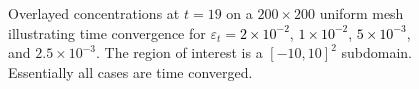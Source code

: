 \begin{figure}[hbtp]
\begin{centering}
    \caption[Overlayed concentrations at $t=19$ on a $200\times 200$ uniform mesh illustrating time convergence]{Overlayed concentrations at $t=19$ on a $200\times 200$ uniform mesh illustrating time convergence for $\varepsilon_t=$\textcolor{black}{$2\times 10^{-2}$}, \textcolor{black}{$1\times 10^{-2}$}, \textcolor{black}{$5\times 10^{-3}$}, and $2.5\times 10^{-3}$.  The region of interest is a $[-10,10]^2$ subdomain.  Essentially all cases are time converged.}
  \end{centering}
\end{figure}




